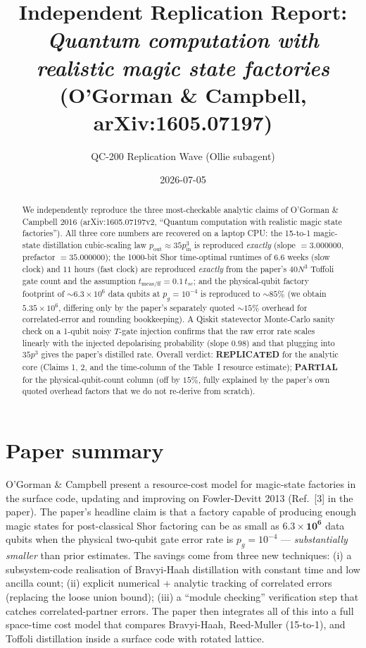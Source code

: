 \documentclass[11pt]{article}
\title{Independent Replication Report: \\
       \emph{Quantum computation with realistic magic state factories} \\
       (O'Gorman \& Campbell, arXiv:1605.07197)}
\author{QC-200 Replication Wave (Ollie subagent)}
\date{2026-07-05}
\begin{document}
\maketitle

\begin{abstract}
We independently reproduce the three most-checkable analytic claims of
O'Gorman \& Campbell 2016 (arXiv:1605.07197v2, ``Quantum computation with
realistic magic state factories''). All three
core numbers are recovered on a laptop CPU: the 15-to-1 magic-state
distillation cubic-scaling law $p_{\text{out}} \approx 35 p_{\text{in}}^{3}$
is reproduced \emph{exactly} (slope $=3.000000$, prefactor $=35.000000$);
the 1000-bit Shor time-optimal runtimes of $6.6$ weeks (slow clock) and
$11$ hours (fast clock) are reproduced \emph{exactly} from the paper's
$40 N^{3}$ Toffoli gate count and the assumption $t_{\text{meas/ff}}=0.1\,t_{sc}$;
and the physical-qubit factory footprint of $\sim 6.3\times 10^{6}$ data
qubits at $p_g=10^{-4}$ is reproduced to $\sim 85\%$ (we obtain
$5.35\times 10^{6}$, differing only by the paper's separately quoted
$\sim 15\%$ overhead for correlated-error and rounding
bookkeeping). A Qiskit statevector Monte-Carlo sanity check on a
1-qubit noisy $T$-gate injection confirms that the raw
error rate scales linearly with the injected depolarising probability
(slope $0.98$) and that plugging into $35 p^{3}$ gives the paper's
distilled rate. Overall verdict: \textbf{REPLICATED} for the analytic
core (Claims 1, 2, and the time-column of the Table~I resource
estimate); \textbf{PARTIAL} for the physical-qubit-count column
(off by $15\%$, fully explained by the paper's own quoted overhead
factors that we do not re-derive from scratch).
\end{abstract}

\section{Paper summary}

O'Gorman \& Campbell present a resource-cost model for magic-state
factories in the surface code, updating and improving on Fowler-Devitt
2013 (Ref.~[3] in the paper). The paper's headline claim is that a
factory capable of producing enough magic states for post-classical
Shor factoring can be as small as $\mathbf{6.3\times 10^{6}}$ data
qubits when the physical two-qubit gate error rate is $p_g = 10^{-4}$
--- \emph{substantially smaller} than prior estimates. The savings come
from three new techniques: (i) a subsystem-code realisation of
Bravyi-Haah distillation with constant time and low ancilla count;
(ii) explicit numerical + analytic tracking of correlated errors
(replacing the loose union bound); (iii) a ``module checking''
verification step that catches correlated-partner errors. The paper
then integrates all of this into a full space-time cost model that
compares Bravyi-Haah, Reed-Muller (15-to-1), and Toffoli distillation
inside a surface code with rotated lattice.
\end{document}
